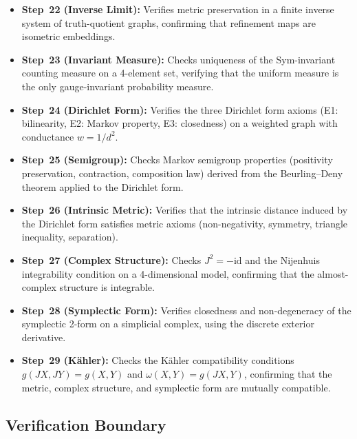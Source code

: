 \begin{itemize}
  \item \textbf{Step~22 (Inverse Limit):} Verifies metric preservation
    in a finite inverse system of truth-quotient graphs, confirming that
    refinement maps are isometric embeddings.

  \item \textbf{Step~23 (Invariant Measure):} Checks uniqueness of the
    Sym-invariant counting measure on a 4-element set, verifying that
    the uniform measure is the only gauge-invariant probability measure.

  \item \textbf{Step~24 (Dirichlet Form):} Verifies the three Dirichlet
    form axioms (E1: bilinearity, E2: Markov property, E3: closedness)
    on a weighted graph with conductance $w = 1/d^2$.

  \item \textbf{Step~25 (Semigroup):} Checks Markov semigroup properties
    (positivity preservation, contraction, composition law) derived from
    the Beurling--Deny theorem applied to the Dirichlet form.

  \item \textbf{Step~26 (Intrinsic Metric):} Verifies that the intrinsic
    distance induced by the Dirichlet form satisfies metric axioms
    (non-negativity, symmetry, triangle inequality, separation).

  \item \textbf{Step~27 (Complex Structure):} Checks $J^2 = -\mathrm{id}$
    and the Nijenhuis integrability condition on a 4-dimensional model,
    confirming that the almost-complex structure is integrable.

  \item \textbf{Step~28 (Symplectic Form):} Verifies closedness and
    non-degeneracy of the symplectic 2-form on a simplicial complex,
    using the discrete exterior derivative.

  \item \textbf{Step~29 (K\"ahler):} Checks the K\"ahler compatibility
    conditions $g(JX, JY) = g(X, Y)$ and $\omega(X, Y) = g(JX, Y)$,
    confirming that the metric, complex structure, and symplectic form
    are mutually compatible.
\end{itemize}

\subsection{Verification Boundary}

